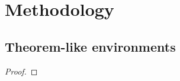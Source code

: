 \chapter{Methodology}
\label{ch:impl}

\section{Theorem-like environments}

\begin{definition}

\end{definition}

\begin{theorem}

\end{theorem}

\begin{proof}

\end{proof}

\begin{remark}

\end{remark}

\begin{note}

\end{note}